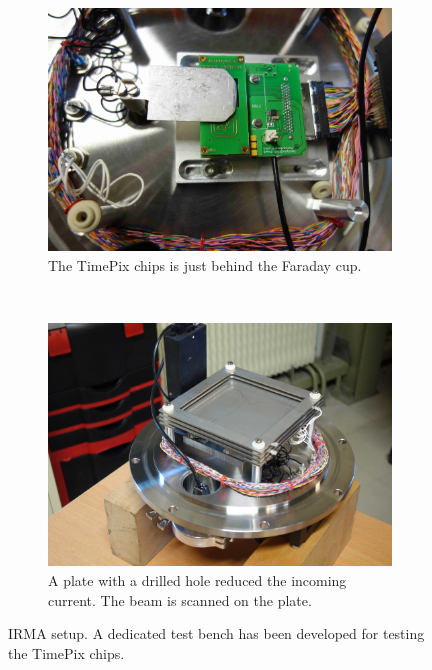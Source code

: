 \begin{figure}[!ht]
	\begin{subfigure}[t]{0.5\textwidth}
		\includegraphics[width=\textwidth]{04_IPHI_Test/figures/fig000_IRMA_setup01}
		\caption{The TimePix chips is just behind the Faraday cup.}
		\label{}
	\end{subfigure}
	~
	\begin{subfigure}[t]{0.5\textwidth}
		\includegraphics[width=\textwidth]{04_IPHI_Test/figures/fig000_IRMA_setup02}
		\caption{A plate with a drilled hole reduced the incoming current. The beam is scanned on the plate.}
		\label{}
	\end{subfigure}
	\caption[IRMA setup]{IRMA setup. A dedicated test bench has been developed for testing the TimePix chips.}
	\label{chap4:IRMA_setup}
\end{figure}
